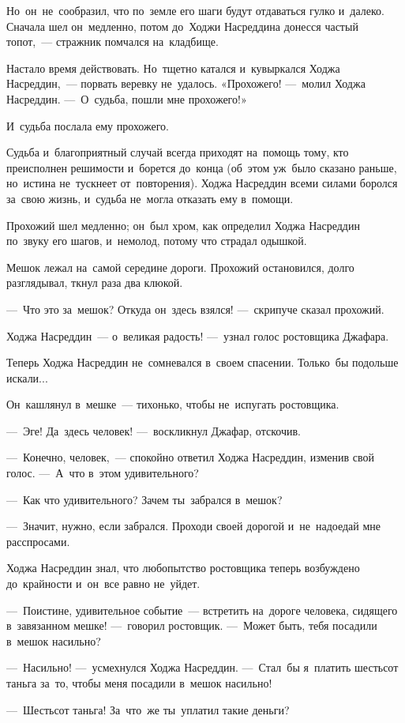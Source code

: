 \documentclass[12pt,a4paper]{book}
\begin{document}
Но~он~не~сообразил, что по~земле его шаги будут отдаваться гулко и~далеко. Сначала шел он~медленно, потом до~Ходжи Насреддина донесся частый топот,~— стражник помчался на~кладбище.

Настало время действовать. Но~тщетно катался и~кувыркался Ходжа Насреддин,~— порвать веревку не~удалось. «Прохожего! —~молил Ходжа Насреддин. —~О~судьба, пошли мне прохожего!»

И~судьба послала ему прохожего.

Судьба и~благоприятный случай всегда приходят на~помощь тому, кто преисполнен решимости и~борется до~конца (об~этом уж~было сказано раньше, но~истина не~тускнеет от~повторения). Ходжа Насреддин всеми силами боролся за~свою жизнь, и~судьба не~могла отказать ему в~помощи.

Прохожий шел медленно; он~был хром, как определил Ходжа Насреддин по~звуку его шагов, и~немолод, потому что страдал одышкой.

Мешок лежал на~самой середине дороги. Прохожий остановился, долго разглядывал, ткнул раза два клюкой.

—~Что это за~мешок? Откуда он~здесь взялся! —~скрипуче сказал прохожий.

Ходжа Насреддин~— о~великая радость! —~узнал голос ростовщика Джафара.

Теперь Ходжа Насреддин не~сомневался в~своем спасении. Только~бы подольше искали...

Он~кашлянул в~мешке~— тихонько, чтобы не~испугать ростовщика.

—~Эге! Да~здесь человек! —~воскликнул Джафар, отскочив.

—~Конечно, человек,~— спокойно ответил Ходжа Насреддин, изменив свой голос. —~А~что в~этом удивительного?

—~Как что удивительного? Зачем ты~забрался в~мешок?

—~Значит, нужно, если забрался. Проходи своей дорогой и~не~надоедай мне расспросами.

Ходжа Насреддин знал, что любопытство ростовщика теперь возбуждено до~крайности и~он~все равно не~уйдет.

—~Поистине, удивительное событие~— встретить на~дороге человека, сидящего в~завязанном мешке! —~говорил ростовщик. —~Может быть, тебя посадили в~мешок насильно?

—~Насильно! —~усмехнулся Ходжа Насреддин. —~Стал~бы я~платить шестьсот таньга за~то, чтобы меня посадили в~мешок насильно!

—~Шестьсот таньга! За~что~же ты~уплатил такие деньги?
\end{document}
